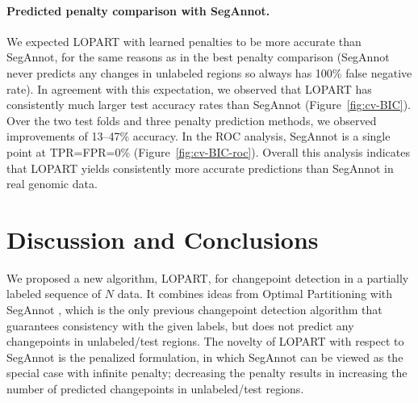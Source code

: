 \documentclass[12pt]{article}
\begin{document}
\paragraph{Predicted penalty comparison with SegAnnot.} 
We expected LOPART with learned penalties to be more accurate than SegAnnot, for the same reasons as in the best penalty comparison (SegAnnot never predicts any changes in unlabeled regions so always has 100\% false negative rate).
In agreement with this expectation, we observed that LOPART has consistently much larger test accuracy rates than SegAnnot (Figure~\ref{fig:cv-BIC}).
Over the two test folds and three penalty prediction methods, we observed improvements of 13--47\% accuracy.
In the ROC analysis, SegAnnot is a single point at TPR=FPR=0\% (Figure~\ref{fig:cv-BIC-roc}).
Overall this analysis indicates that LOPART yields consistently more accurate predictions than SegAnnot in real genomic data. 

\section{Discussion and Conclusions}

We proposed a new algorithm, LOPART, for changepoint detection in a partially labeled sequence of $N$ data.
It combines ideas from Optimal Partitioning \citep{Jackson2005} with SegAnnot \citep{Hocking2014}, which is the only previous changepoint detection algorithm that guarantees consistency with the given labels, but does not predict any changepoints in unlabeled/test regions.
The novelty of LOPART with respect to SegAnnot is the penalized formulation, in which SegAnnot can be viewed as the special case with infinite penalty; decreasing the penalty results in increasing the number of predicted changepoints in unlabeled/test regions.
\end{document}
